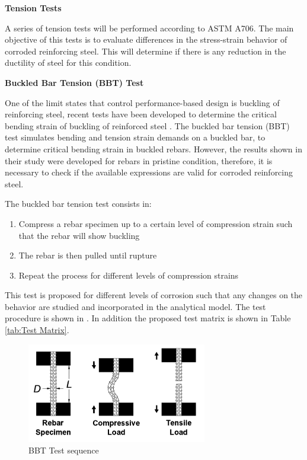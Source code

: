 \textbf{Tension Tests}

A series of tension tests will be performed according to ASTM A706. The main objective of this tests is to evaluate differences in the stress-strain behavior of corroded reinforcing steel. This will determine if there is any reduction in the ductility of steel for this condition.
\newline

\textbf{Buckled Bar Tension (BBT) Test}

One of the limit states that control performance-based design is buckling of reinforcing steel, recent tests have been developed to determine the critical bending strain of buckling of reinforced steel \cite{Barcley2019}. The buckled bar tension (BBT) test simulates bending and tension strain demands on a buckled bar, to determine critical bending strain in buckled rebars. However, the results shown in their study were developed for rebars in pristine condition, therefore, it is necessary to check if the available expressions are valid for corroded reinforcing steel.

The buckled bar tension test consists in:

\begin{enumerate}
	\item Compress a rebar specimen up to a certain level of compression strain such that the rebar will show buckling
	\item The rebar is then pulled until rupture
	\item Repeat the process for different levels of compression strains 
\end{enumerate}

This test is proposed for different levels of corrosion such that any changes on the behavior are studied and incorporated in the analytical model. The test procedure is shown in . In addition the proposed test matrix is shown in Table \ref{tab:Test Matrix}.

\begin{figure}[htbp]
	\centering
	\includegraphics[width=0.7\textwidth]{Chapter-4/figs/BBT_Sequence}
	\caption{BBT Test sequence\cite{Barcley2019}}
	\label{fig:BBTseq}
\end{figure}

